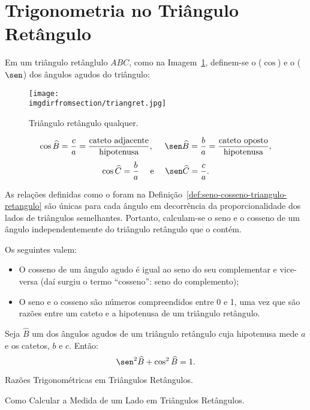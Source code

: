 \section{Trigonometria no Triângulo Retângulo}

\begin{definition}
\label{def:seno-cosseno-triangulo-retangulo}
Em um triângulo retânglulo $ABC$, como na Imagem~\ref{fig:triangulo-retangulo}, definem-se o
 ($\cos$) e o  ($\sen$) dos ângulos agudos do
triângulo:
%
\begin{figure}[H]
\centering
\texttt{[image: \\imgdirfromsection/triangret.jpg]}
\caption{Triângulo retângulo qualquer.}
\label{fig:triangulo-retangulo}
\end{figure}
%
$$\cos \widehat B = \frac c a = \frac {\text{cateto
adjacente}}{\text{hipotenusa}}, \ \ \ \ \sen \widehat B = \frac b a = \frac
{\text{cateto oposto}}{\text{hipotenusa}},$$
$$\cos \widehat C = \frac b a \ \ \ \ \text{e} \ \ \ \ \sen \widehat
C = \frac c a.$$    
\end{definition}

\begin{remark}
As relações definidas como o foram na Definição~\ref{def:seno-cosseno-triangulo-retangulo} são únicas para cada ângulo em
decorrência da proporcionalidade dos lados de triângulos
semelhantes. Portanto, calculam-se o seno e o cosseno de um ângulo
independentemente do triângulo retângulo que o contém.
\end{remark}

\begin{proposition}
Os seguintes valem:
\begin{itemize}
    \item O cosseno de um ângulo agudo é igual ao seno do seu
    complementar e vice-versa (daí surgiu o termo ``cosseno'': seno do complemento);
    \item O seno e o cosseno são números compreendidos entre 0 e 1, uma vez que são razões entre um cateto 
    e a hipotenusa de um triângulo retângulo.
\end{itemize}
\end{proposition}

\begin{proposition}
Seja $\widehat B$ um dos ângulos agudos de um triângulo retângulo
cuja hipotenusa mede $a$ e os catetos, $b$ e $c$. Então:
$$\sen^2 \widehat B + \cos^2 \widehat B = 1.$$
\end{proposition}

\begin{onlineact}
    {Razões Trigonométricas em Triângulos
Retângulos}.
\end{onlineact}

\begin{onlineact}
    {Como Calcular a Medida de um Lado em Triângulos Retângulos}.
\end{onlineact}